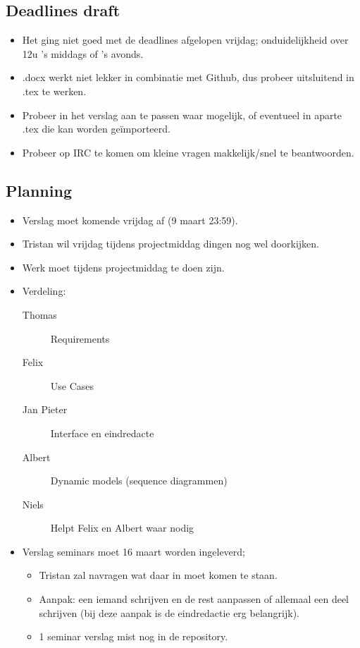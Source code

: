 \documentclass[a4paper]{article}
\begin{document}
\subsection{Deadlines draft}
\begin{itemize}
\renewcommand{\labelitemi}{$\bullet$}
\item Het ging niet goed met de deadlines afgelopen vrijdag; onduidelijkheid over 12u 's middags of 's avonds.
\item .docx werkt niet lekker in combinatie met Github, dus probeer uitsluitend in .tex te werken.
\item Probeer in het verslag aan te passen waar mogelijk, of eventueel in aparte .tex die kan worden ge\"importeerd.
\item Probeer op IRC te komen om kleine vragen makkelijk/snel te beantwoorden.
\end{itemize}

\subsection{Planning}
\begin{itemize}
\renewcommand{\labelitemi}{$\bullet$}
\item Verslag moet komende vrijdag af (9 maart 23:59).
\item Tristan wil vrijdag tijdens projectmiddag dingen nog wel doorkijken.
\item Werk moet tijdens projectmiddag te doen zijn.

\item Verdeling:
\begin{description}
\item[Thomas] Requirements
\item[Felix] Use Cases
\item[Jan Pieter] Interface en eindredacte
\item[Albert] Dynamic models (sequence diagrammen)
\item[Niels] Helpt Felix en Albert waar nodig
\end{description}

\item Verslag seminars moet 16 maart worden ingeleverd;
\begin{itemize}
\item Tristan zal navragen wat daar in moet komen te staan.
\item Aanpak: een iemand schrijven en de rest aanpassen of allemaal een deel schrijven (bij deze aanpak is de eindredactie erg belangrijk).
\item 1 seminar verslag mist nog in de repository.
\end{itemize}

\end{itemize}
\end{document}
